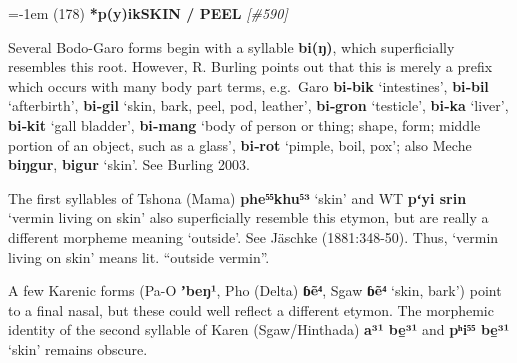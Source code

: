 \vspace{1em}
{\large
\parindent=-1em
(178)  \textbf{*p(y)ik}\textbf{SKIN / PEEL} \textit{\tiny[\#590]}}

Several Bodo-Garo forms begin with a syllable \textbf{bi(ŋ)}, which superficially resembles this root. However, R. Burling points out that this is merely a prefix which occurs with many body part terms, e.g.\ Garo \textbf{bi‑bik} ‘intestines’, \textbf{bi‑bil} ‘afterbirth’, \textbf{bi‑gil} ‘skin, bark, peel, pod, leather’, \textbf{bi‑gron} ‘testicle’, \textbf{bi‑ka} ‘liver’, \textbf{bi‑kit} ‘gall bladder’, \textbf{bi‑mang} ‘body of person or thing; shape, form; middle portion of an object, such as a glass’, \textbf{bi‑rot} ‘pimple, boil, pox’; also Meche \textbf{biŋgur}, \textbf{bigur} ‘skin’. See Burling 2003.

The first syllables of Tshona (Mama) \textbf{phe⁵⁵khu⁵³} ‘skin’ and WT \textbf{pʻyi srin} ‘vermin living on skin’ also superficially resemble this etymon, but are really a different morpheme meaning ‘outside’. See Jäschke (1881:348-50). Thus, ‘vermin living on skin’ means lit. “outside vermin”.

A few Karenic forms (Pa-O \textbf{ ʼbeŋ¹},  Pho (Delta) \textbf{ɓẽ⁴}, Sgaw \textbf{ɓẽ⁴} ‘skin, bark’) point to a final nasal, but these could well reflect a different etymon. The morphemic identity of the second syllable of Karen (Sgaw/Hinthada) \textbf{a³¹ be̱³¹} and \textbf{pʰi⁵⁵ be̱³¹} ‘skin’ remains obscure.



